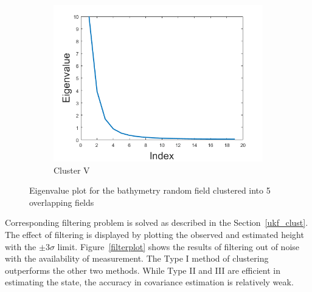 \begin{figure}[H]
\begin{subfigure}[b]{0.4\textwidth}
\includegraphics[width=\textwidth]{figures_2/eig5}
\caption{Cluster V}
\end{subfigure}   
\caption{Eigenvalue plot for the bathymetry random field clustered into 5 overlapping fields}
\label{eigenvalue_cluster}
\end{figure}


Corresponding filtering problem is solved as described in the Section~\ref{ukf_clust}. The effect of filtering is displayed by plotting the observed and estimated height with the $\pm 3\sigma$ limit. Figure~\ref{filterplot} shows the results of filtering out of noise with the availability of measurement. The Type I method of clustering outperforms the other two methods. While Type II and III are efficient in estimating the state, the accuracy in covariance estimation is relatively weak. 


